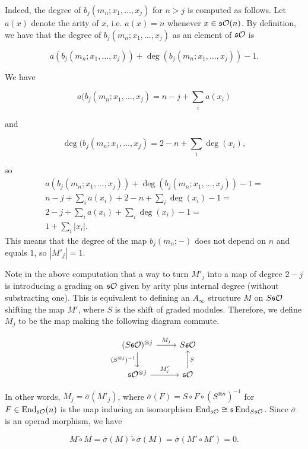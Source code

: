 \documentclass[twoside]{article}
\begin{document}
Indeed, the degree of $b_j(m_n;x_1,\dots,x_j)$ for $n>j$ is computed as follows. Let $a(x)$ denote the arity of $x$, i.e. $a(x)=n$ whenever $x\in\mathfrak{s}{\mathcal O}(n)$. By definition, we have that the degree of $b_j(m_n;x_1,\dots,x_j)$ as an element of $\mathfrak{s}{\mathcal O}$ is

\[a(b_j(m_n;x_1,\dots,x_j))+\deg(b_j(m_n;x_1,\dots,x_j))-1.\]

We have 

\[a(b_j(m_n;x_1,\dots,x_j)=n-j+\sum_i a(x_i)\]

and 

\[\deg(b_j(m_n;x_1,\dots,x_j)=2-n+\sum_i\deg(x_i),\]

so 
\begin{align*}
a(b_j(m_n;x_1,\dots,x_j))+\deg(b_j(m_n;x_1,\dots,x_j))-1=\\
n-j+\sum_i a(x_i)+2-n+\sum_i\deg(x_i)-1=\\
2-j+\sum_i a(x_i)+\sum_i\deg(x_i)-1=\\
1+\sum_i|x_i|.
\end{align*}
This means that the degree of the map $b_j(m_n;-)$ does not depend on $n$ and equals $1$, so $|M'_j|=1$. %

Note in the above computation that a way to turn $M'_j$ into a map of degree $2-j$ is introducing a grading on $\mathfrak{s}{\mathcal O}$ given by arity plus internal degree (without substracting one). This is equivalent to defining an $A_\infty$ structure $M$ on $S\mathfrak{s}{\mathcal O}$ shifting the map $M'$, where $S$ is the shift of graded modules. Therefore, we define $M_j$ to be the map making the following diagram commute.

\[
\begin{tikzcd}
(S\s\OO)^{\otimes j}\arrow[r,"M_j"]\arrow[d, "(S^{\otimes j})^{-1}"'] & S\s\OO\\
\s\OO^{\otimes j}\arrow[r, "M'_j"] & \s\OO\arrow[u,"S"']
\end{tikzcd}
\]

In other words, $M_j=\overline{\sigma}(M'_j)$, where $\overline{\sigma}(F)=S\circ F\circ (S^{\otimes n})^{-1}$ for $F\in\operatorname{End}_{\mathfrak{s}{\mathcal O}}(n)$ is the map inducing an isomorphism $\operatorname{End}_{\mathfrak{s}{\mathcal O}}\cong \mathfrak{s}\operatorname{End}_{S\mathfrak{s}{\mathcal O}}$. Since $\overline{\sigma}$ is an operad morphism, we have

\[
M\tilde{\circ}M=\overline{\sigma}(M)\tilde{\circ}\overline{\sigma}(M)=\overline{\sigma}(M'\circ M')=0.
\]
\end{document}
